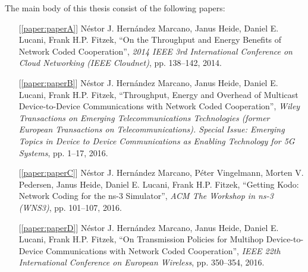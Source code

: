 \noindent The main body of this thesis consist of the following papers:
\begin{itemize}

  \item[{[\ref{paper:paperA}]}] N\'estor J. Hern\'andez Marcano, Janus Heide, Daniel E. Lucani, Frank H.P. Fitzek, ``On the Throughput and Energy Benefits of Network Coded Cooperation'', \emph{2014 IEEE 3rd International Conference on Cloud Networking (IEEE Cloudnet)}, pp. 138--142, 2014.

  \item[{[\ref{paper:paperB}]}] N\'estor J. Hern\'andez Marcano, Janus Heide, Daniel E. Lucani, Frank H.P. Fitzek, ``Throughput, Energy and Overhead of Multicast Device-to-Device Communications with Network Coded Cooperation'', \emph{Wiley Transactions on Emerging Telecommunications Technologies  (former European Transactions on Telecommunications). Special Issue: Emerging Topics in Device to Device Communications as Enabling Technology for 5G Systems}, pp. 1--17, 2016.

  \item[{[\ref{paper:paperC}]}] N\'estor J. Hern\'andez Marcano, P\'eter Vingelmann, Morten V. Pedersen, Janus Heide, Daniel E. Lucani, Frank H.P. Fitzek, ``Getting Kodo: Network Coding for the ns-3 Simulator'', \emph{ACM The Workshop in ns-3 (WNS3)}, pp. 101--107, 2016.

  \item[{[\ref{paper:paperD}]}] N\'estor J. Hern\'andez Marcano, Janus Heide, Daniel E. Lucani, Frank H.P. Fitzek, ``On Transmission Policies for Multihop Device-to-Device Communications with Network Coded Cooperation'', \emph{IEEE 22th International Conference on European Wireless}, pp. 350--354, 2016.

\end{itemize}

